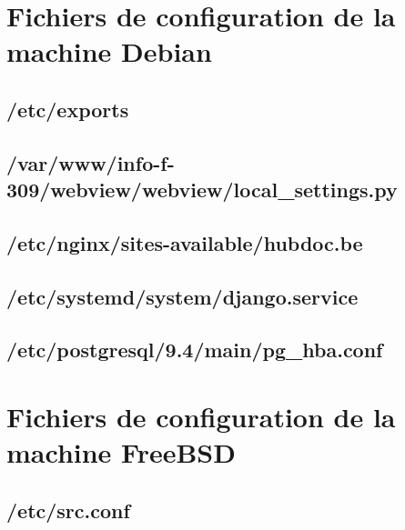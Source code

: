 \documentclass[10pt,a4paper]{article}
\begin{document}
\newpage
\begin{appendices}
  \section{Fichiers de configuration de la machine Debian}
  \subsection{/etc/exports}
  \label{subs:etc-exports}
  

  \subsection{/var/www/info-f-309/webview/webview/local\_settings.py}
  \label{subs:deb-webview-local-settings}
  

  \subsection{/etc/nginx/sites-available/hubdoc.be}
  \label{subs:deb-nginx-sites-avail-hubdoc}
  

  \subsection{/etc/systemd/system/django.service}
  \label{subs:deb-django-service}
  

  \subsection{/etc/postgresql/9.4/main/pg\_hba.conf}
  \label{subs:deb-pg-hba}
  

  \section{Fichiers de configuration de la machine FreeBSD}

  \subsection{/etc/src.conf}
  \label{sub:etc-src-conf}
  


\end{appendices}
\end{document}
